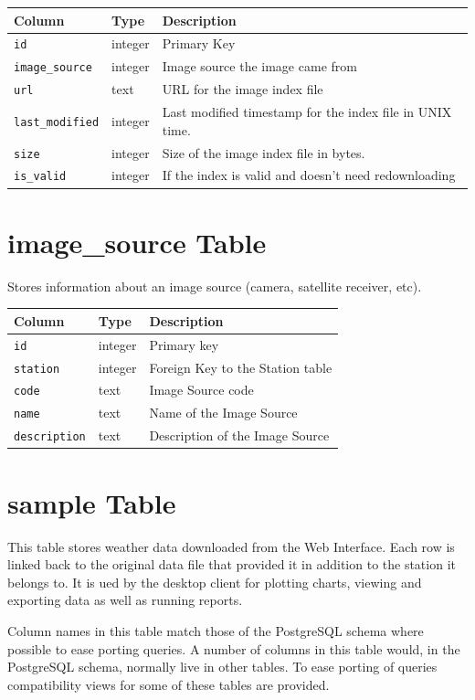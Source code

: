 \documentclass[a4paper,10pt]{book}
\begin{document}
\begin{tabular}{p{2.5cm} p{2.5cm} p{8.6cm}}
\hline
\textbf{Column} & \textbf{Type} & \textbf{Description} \\
\hline
\verb|id| & integer & Primary Key\\
\verb|image_source| & integer & Image source the image came from\\
\verb|url| & text & URL for the image index file\\
\verb|last_modified| & integer & Last modified timestamp for the index file in UNIX time.\\
\verb|size| & integer & Size of the image index file in bytes.\\
\verb|is_valid| & integer & If the index is valid and doesn't need redownloading\\
\hline
\end{tabular}

\section{image\_source Table}
Stores information about an image source (camera, satellite receiver, etc).

\begin{tabular}{p{2.5cm} p{2.5cm} l}
\hline
\textbf{Column} & \textbf{Type} & \textbf{Description} \\
\hline
\verb|id| & integer & Primary key\\
\verb|station| & integer & Foreign Key to the Station table\\
\verb|code| & text & Image Source code\\
\verb|name| & text & Name of the Image Source\\
\verb|description| & text & Description of the Image Source\\
\hline
\end{tabular}

\section{sample Table}
This table stores weather data downloaded from the Web Interface. Each row is linked back to the original data file that provided it in addition to the station it belongs to. It is ued by the desktop client for plotting charts, viewing and exporting data as well as running reports.

Column names in this table match those of the PostgreSQL schema where possible to ease porting queries. A number of columns in this table would, in the PostgreSQL schema, normally live in other tables. To ease porting of queries compatibility views for some of these tables are provided.
\end{document}
